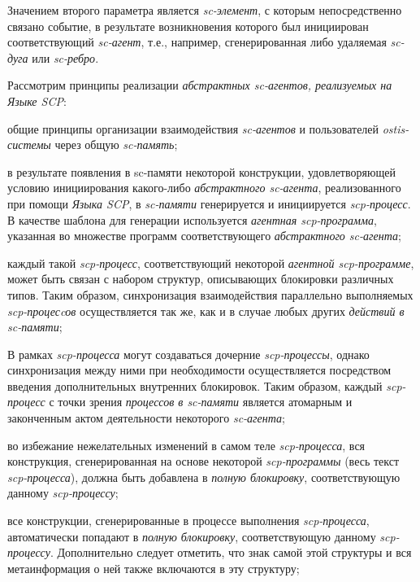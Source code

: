 Значением второго параметра является \textit{sc-элемент}, с которым непосредственно связано событие, в результате возникновения которого был инициирован соответствующий \textit{sc-агент}, т.е., например, сгенерированная либо удаляемая \textit{sc-дуга} или \textit{sc-ребро}.

Рассмотрим принципы реализации \textit{абстрактных sc-агентов, реализуемых на Языке SCP}:
\begin{textitemize}
\item общие принципы организации взаимодействия \textit{sc-агентов} и пользователей \textit{ostis-системы} через общую \textit{sc-память};
\item в результате появления в sc-памяти некоторой конструкции,
удовлетворяющей условию инициирования какого-либо \textit{абстрактного sc-агента}, реализованного при помощи \textit{Языка SCP}, в \textit{sc-памяти} генерируется и инициируется \textit{scp-процесс}. В качестве шаблона для генерации используется \textit{агентная scp-программа}, указанная во множестве программ соответствующего \textit{абстрактного sc-агента};
\item каждый такой \textit{scp-процесс}, соответствующий некоторой \textit{агентной scp-программе}, может быть связан с набором структур, описывающих блокировки различных типов. Таким образом, синхронизация взаимодействия параллельно выполняемых \textit{scp-процесcов} осуществляется так же, как и в случае любых других \textit{действий в sc-памяти};
\item В рамках \textit{scp-процесса} могут создаваться дочерние
\textit{scp-процессы}, однако синхронизация между ними при необходимости осуществляется посредством введения дополнительных внутренних блокировок. Таким образом, каждый \textit{scp-процесс} с точки зрения \textit{процессов в sc-памяти} является атомарным и законченным актом деятельности некоторого \textit{sc-агента};
\item во избежание нежелательных изменений в самом теле \textit{scp-процесса}, вся конструкция, сгенерированная на основе некоторой \textit{scp-программы} (весь текст \textit{scp-процесса}), должна быть добавлена в \textit{полную блокировку}, соответствующую данному \textit{scp-процессу};
\item все конструкции, сгенерированные в процессе выполнения
\textit{scp-процесса}, автоматически попадают в \textit{полную 	блокировку}, соответствующую данному \textit{scp-процессу}. Дополнительно следует отметить, что знак самой этой структуры и вся метаинформация о ней также включаются в эту структуру;

\end{textitemize}
